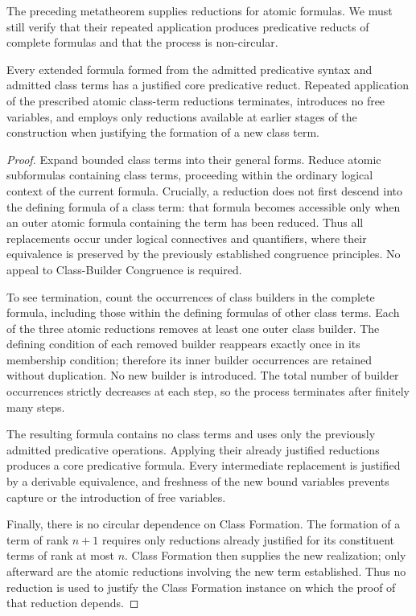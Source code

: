 
The preceding metatheorem supplies reductions for atomic formulas.
We must still verify that their repeated application produces
predicative reducts of complete formulas and that the process is
non-circular.

\begin{metatheorem}
\label{meta:predicative-admissibility-of-class-term-formulas}
Every extended formula formed from the admitted predicative syntax
and admitted class terms has a justified core predicative reduct.
Repeated application of the prescribed atomic class-term reductions
terminates, introduces no free variables, and employs only
reductions available at earlier stages of the construction when
justifying the formation of a new class term.
\end{metatheorem}

\begin{proof}
Expand bounded class terms into their general forms. Reduce atomic
subformulas containing class terms, proceeding within the ordinary
logical context of the current formula. Crucially, a reduction does
not first descend into the defining formula of a class term: that
formula becomes accessible only when an outer atomic formula
containing the term has been reduced. Thus all replacements occur
under logical connectives and quantifiers, where their equivalence
is preserved by the previously established congruence principles.
No appeal to Class-Builder Congruence is required.

To see termination, count the occurrences of class builders in the
complete formula, including those within the defining formulas of
other class terms. Each of the three atomic reductions removes at
least one outer class builder. The defining condition of each
removed builder reappears exactly once in its membership condition;
therefore its inner builder occurrences are retained without
duplication. No new builder is introduced. The total number of
builder occurrences strictly decreases at each step, so the process
terminates after finitely many steps.

The resulting formula contains no class terms and uses only the
previously admitted predicative operations. Applying their already
justified reductions produces a core predicative formula. Every
intermediate replacement is justified by a derivable equivalence,
and freshness of the new bound variables prevents capture or the
introduction of free variables.

Finally, there is no circular dependence on Class Formation. The
formation of a term of rank \(n+1\) requires only reductions
already justified for its constituent terms of rank at most \(n\).
Class Formation then supplies the new realization; only afterward
are the atomic reductions involving the new term established. Thus
no reduction is used to justify the Class Formation instance on
which the proof of that reduction depends.
\end{proof}

